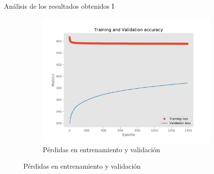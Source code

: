 \begin{frame}{Análisis de los resultados obtenidos I}
\begin{figure}
\begin{subfigure}[t]{0.45\textwidth}
			\includegraphics[width=\textwidth]{../figures/one_to_one_results_loss.pdf}
			\vspace*{-7pt}
			\caption{Pérdidas en entrenamiento y validación}
		\end{subfigure}
	\end{figure}
\end{frame}
